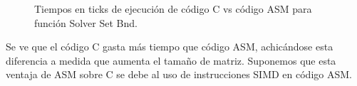 \begin{figure}[htbp]
\centering


\caption{Tiempos en ticks de ejecución de código C vs código ASM para función Solver Set Bnd.} \label{fig:lego}
\end{figure}

Se ve que el código C gasta más tiempo que código ASM, achicándose esta diferencia a medida que aumenta el tamaño de matriz. Suponemos que esta ventaja de ASM sobre C se debe al uso de instrucciones SIMD en código ASM.

